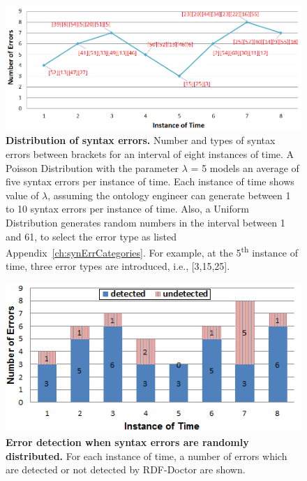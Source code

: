 \begin{figure}[ht]
	\begin{center}
		\includegraphics[scale=0.55,angle=0]{images/Experiment02-01.png}
		\setlength\belowcaptionskip{-5mm}
		\caption{\textbf{Distribution of syntax errors.} Number and types of syntax errors between brackets for an interval of eight instances of time. 
		A Poisson Distribution with the parameter $\lambda$ = 5 models an average of five syntax errors per instance of time. 
		Each instance of time shows value of $\lambda$, assuming the ontology engineer can generate between 1 to 10 syntax errors per instance of time. 
		Also, a Uniform Distribution generates random numbers in the interval between 1 and 61, to select the error type as listed Appendix~\ref{ch:synErrCategories}. 
		For example, at the 5\textsuperscript{th} instance of time, three error types are introduced, i.e., [3,15,25].} 
		\label{Fig:experiment2}
	\end{center}
\end{figure}


	\begin{figure}[ht]
	\begin{center}
		\includegraphics[scale=1,angle=0]{images/Experiment02-02.png}
		\caption{\textbf{Error detection when syntax errors are randomly distributed.} 
		For each instance of time, a number of errors which are detected or not detected by RDF-Doctor are shown.
		} 
		\label{Fig:Experiment02-02}
	\end{center}
\end{figure}

